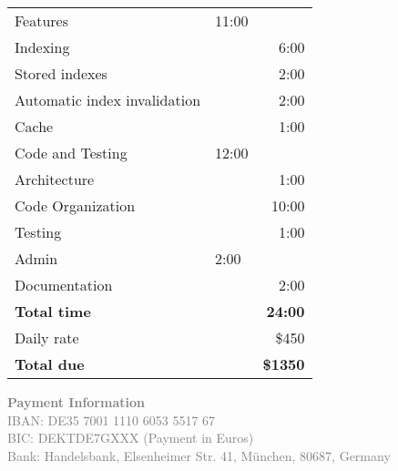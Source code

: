 \documentclass[11pt]{article}
\begin{document}
\begin{table}[htb]
\centering

\begin{tabular}{llr}


\hline



Features & 11:00 & \\
\hspace*{1em} Indexing &  & 6:00\\
\hspace*{1em} Stored indexes &  & 2:00\\
\hspace*{1em} Automatic index invalidation &  & 2:00\\
\hspace*{1em} Cache &  & 1:00\\
Code and Testing & 12:00 & \\
\hspace*{1em} Architecture &  & 1:00\\
\hspace*{1em} Code Organization &  & 10:00\\
\hspace*{1em} Testing &  & 1:00\\
Admin & 2:00 & \\
\hspace*{1em} Documentation &  & 2:00\\
\hline
\textbf{Total time} & & \textbf{	24:00} \\

Daily rate & & \$450 \\

\textbf{Total due} & & \textbf{\$1350} \\


\hline
\end{tabular}
\end{table}

\vspace{\fill}



\textcolor{gray}{\small
\textbf{Payment Information}\\
IBAN: DE35 7001 1110 6053 5517 67 \\
BIC: DEKTDE7GXXX  (Payment in Euros) \\
Bank: Handelsbank, Elsenheimer Str. 41, München, 80687, Germany
}
\end{document}
